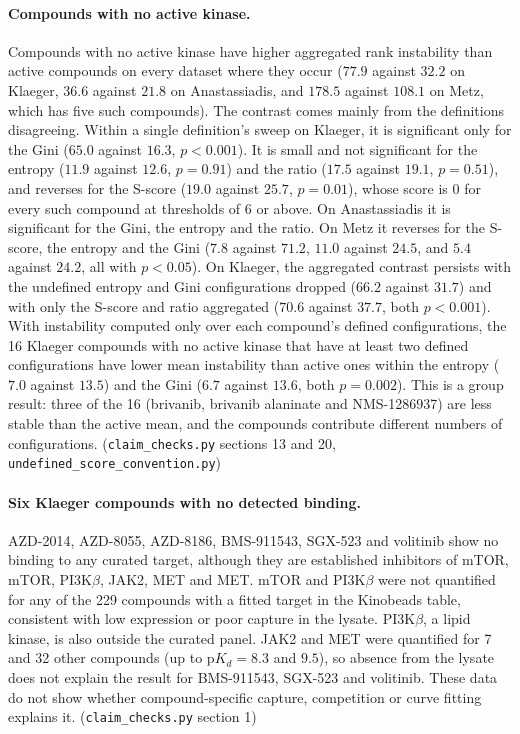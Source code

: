 \documentclass[11pt]{article}
\begin{document}
\paragraph{Compounds with no active kinase.} Compounds with no active kinase
have higher aggregated rank instability than active compounds on every dataset where they occur ($77.9$
against $32.2$ on Klaeger, $36.6$ against $21.8$ on Anastassiadis, and $178.5$
against $108.1$ on Metz, which has five such compounds). The contrast comes
mainly from the definitions disagreeing. Within a single definition's sweep on
Klaeger, it is significant only for the Gini ($65.0$ against $16.3$,
$p < 0.001$). It is small and not significant for the entropy ($11.9$ against
$12.6$, $p = 0.91$) and the ratio ($17.5$ against $19.1$, $p = 0.51$), and
reverses for the S-score ($19.0$ against $25.7$, $p = 0.01$), whose score is $0$
for every such compound at thresholds of 6 or above. On Anastassiadis it is
significant for the Gini, the entropy and the ratio. On Metz it reverses for
the S-score, the entropy and the Gini ($7.8$ against $71.2$, $11.0$ against
$24.5$, and $5.4$ against $24.2$, all with $p < 0.05$). On Klaeger, the aggregated
contrast persists with the undefined entropy and Gini configurations dropped
($66.2$ against $31.7$) and with only the S-score and ratio aggregated ($70.6$
against $37.7$, both $p < 0.001$). With instability computed only over each compound's defined
configurations, the 16 Klaeger compounds with no active kinase that have at
least two defined configurations have lower mean instability than active ones
within the entropy ($7.0$ against $13.5$) and the Gini ($6.7$ against $13.6$,
both $p = 0.002$). This is a group result: three of the 16 (brivanib, brivanib
alaninate and NMS-1286937) are less stable than the active mean, and the
compounds contribute different numbers of configurations. (\texttt{claim\_checks.py} sections 13 and 20,
\texttt{undefined\_\allowbreak{}score\_\allowbreak{}convention.py})

\paragraph{Six Klaeger compounds with no detected binding.} AZD-2014, AZD-8055,
AZD-8186, BMS-911543, SGX-523 and volitinib show no binding to any curated
target, although they are established inhibitors of mTOR, mTOR, PI3K$\beta$,
JAK2, MET and MET. mTOR and PI3K$\beta$ were not quantified for any of the 229
compounds with a fitted target in the Kinobeads table, consistent with low
expression or poor capture in the lysate. PI3K$\beta$, a lipid kinase, is also
outside the curated panel. JAK2 and MET were quantified for 7 and 32 other
compounds (up to $\mathrm{p}K_d = 8.3$ and $9.5$), so absence from the lysate
does not explain the result for BMS-911543, SGX-523 and volitinib. These data
do not show whether compound-specific capture, competition or curve fitting
explains it. (\texttt{claim\_checks.py} section 1)
\end{document}
